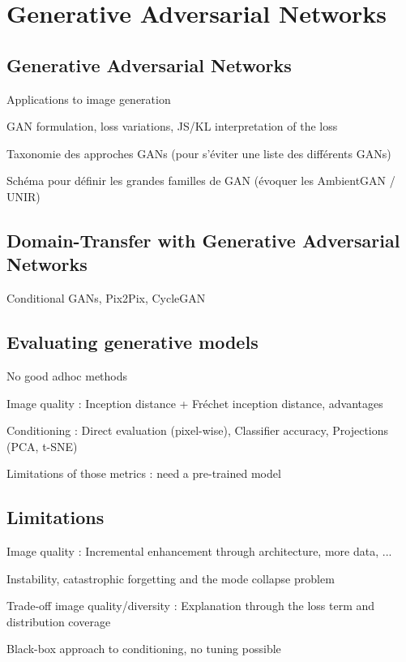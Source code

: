 \chapter{Generative Adversarial Networks}
\label{chap:chapter1}

\section{Generative Adversarial Networks}
Applications to image generation

GAN formulation, loss variations, JS/KL interpretation of the loss

Taxonomie des approches GANs (pour s'éviter une liste des différents GANs)

Schéma pour définir les grandes familles de GAN (évoquer les AmbientGAN / UNIR)


\section{Domain-Transfer with Generative Adversarial Networks}

Conditional GANs, Pix2Pix, CycleGAN

\section{Evaluating generative models}

No good adhoc methods

Image quality : Inception distance + Fréchet inception distance, advantages

Conditioning : Direct evaluation (pixel-wise), Classifier accuracy, Projections (PCA, t-SNE)

Limitations of those metrics : need a pre-trained model

\section{Limitations}
Image quality : Incremental enhancement through architecture, more data, ... 

Instability, catastrophic forgetting and the mode collapse problem

Trade-off image quality/diversity : Explanation through the loss term and distribution coverage

Black-box approach to conditioning, no tuning possible
